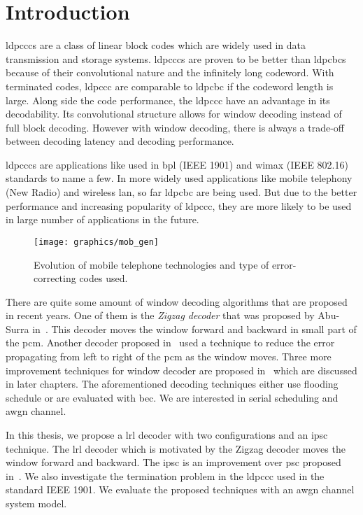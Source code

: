 \chapter{Introduction}
\glspl{ldpccc} are a class of linear block codes which are widely used in data transmission and storage systems. \glspl{ldpccc} are proven to be better than \glspl{ldpcbc} because of their convolutional nature and the infinitely long codeword. With terminated codes, \gls{ldpccc} are comparable to \gls{ldpcbc} if the codeword length is large. Along side the code performance, the \gls{ldpccc} have an advantage in its decodability. Its convolutional structure allows for window decoding instead of full block decoding. However with window decoding, there is always a trade-off between decoding latency and decoding performance.

\glspl{ldpccc} are applications like used in \gls{bpl} (IEEE 1901) and \gls{wimax} (IEEE 802.16) standards to name a few. In more widely used applications like mobile telephony (New Radio) and wireless \gls{lan}, so far \gls{ldpcbc} are being used. But due to the better performance and increasing popularity of \gls{ldpccc}, they are more likely to be used in large number of applications in the future.
\begin{figure}[htbp]
  \centering
  \texttt{[image: graphics/mob\_gen]}
  \caption{Evolution of mobile telephone technologies and type of error-correcting codes used.}
  \label{fig:mob_gen}
\end{figure}

There are quite some amount of window decoding algorithms that are proposed in recent years. One of them is the \emph{Zigzag decoder} that was proposed by Abu-Surra in~\cite{Shadi2015}. This decoder moves the window forward and backward in small part of the \gls{pcm}. Another decoder proposed in~\cite{Kang2018} used a technique to reduce the error propagating from left to right of the \gls{pcm} as the window moves. Three more improvement techniques for window decoder are proposed in~\cite{Ali2018} which are discussed in later chapters. The aforementioned decoding techniques either use flooding schedule or are evaluated with \gls{bec}. We are interested in serial scheduling and \gls{awgn} channel.

In this thesis, we propose a \gls{lrl} decoder with two configurations and an \gls{ipsc} technique. The \gls{lrl} decoder which is motivated by the Zigzag decoder moves the window forward and backward. The \gls{ipsc} is an improvement over \gls{psc} proposed in~\cite{Kang2018}. We also investigate the termination problem in the \gls{ldpccc} used in the standard IEEE 1901. We evaluate the proposed techniques with an \gls{awgn} channel system model.

